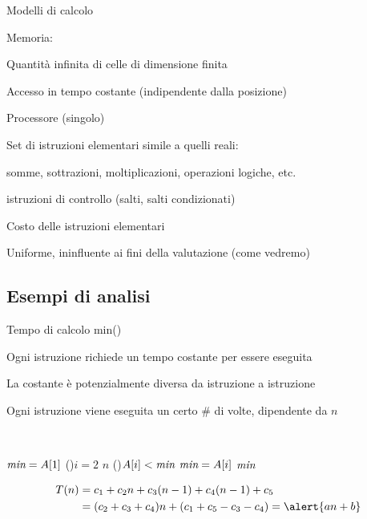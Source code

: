 \begin{frame}{Modelli di calcolo}
\begin{myboxtitle}
\BI
\item \alert{Memoria}:
\BI
\item Quantità infinita di celle di dimensione finita
\item Accesso in tempo costante (indipendente dalla posizione)
\EI
\item \alert{Processore (singolo)}
\BI
\item Set di istruzioni elementari simile a quelli reali: 
\BI
\item  somme, sottrazioni, moltiplicazioni, operazioni logiche, etc. 
\item istruzioni di controllo (salti, salti condizionati)
\EI
\EI
\item \alert{Costo delle istruzioni elementari}
\BI
\item Uniforme, ininfluente ai fini della valutazione (come vedremo)
\EI
\EI
\end{myboxtitle}
\end{frame}

\subsection{Esempi di analisi}

\begin{frame}{Tempo di calcolo \textsf{min}()}
	
\BI
\item Ogni istruzione richiede un tempo costante per essere eseguita
\item La costante è potenzialmente diversa da istruzione a istruzione
\item Ogni istruzione viene eseguita un certo \# di volte, dipendente da $n$
\EI	
	
	
\begin{Procedure}
~
\caption[A]{\Item \MIN($\Item[\,]\ A,\ \INTEGER\ n$)}
\Item $\textit{min} = A[1]$
\For(){$i = 2$ \TO $n$}
{
   \If(){$A[i] < \textit{min}$}{ 
      $\textit{min} = A[i]$
   }
}
\Return $\textit{min}$
\end{Procedure}

\vspace{-12pt}
\begin{align*}
T(n) 	&= c_1+c_2n+c_3(n-1)+c_4(n-1)+c_5\\
		&= (c_2+c_3+c_4)n+(c_1+c_5-c_3-c_4) = \alert{an+b}
\end{align*}
\end{frame}

